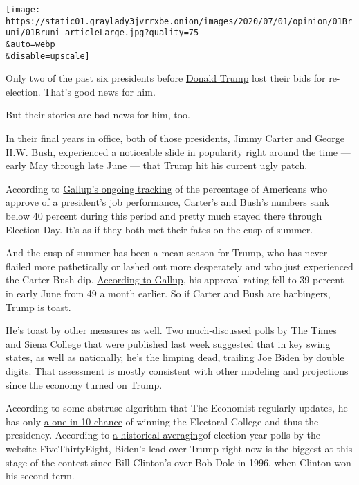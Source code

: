 \texttt{[image: https://static01.graylady3jvrrxbe.onion/images/2020/07/01/opinion/01Bruni/01Bruni-articleLarge.jpg?quality=75\\\&auto=webp\\\&disable=upscale]}

Only two of the past six presidents before
\href{https://www.nytimes3xbfgragh.onion/2020/07/01/us/politics/trump-fundraising-2020.html}{Donald
Trump} lost their bids for re-election. That's good news for him.

But their stories are bad news for him, too.

In their final years in office, both of those presidents, Jimmy Carter
and George H.W. Bush, experienced a noticeable slide in popularity right
around the time --- early May through late June --- that Trump hit his
current ugly patch.

According to
\href{https://news.gallup.com/interactives/185273/presidential-job-approval-center.aspx}{Gallup's
ongoing tracking} of the percentage of Americans who approve of a
president's job performance, Carter's and Bush's numbers sank below 40
percent during this period and pretty much stayed there through Election
Day. It's as if they both met their fates on the cusp of summer.

And the cusp of summer has been a mean season for Trump, who has never
flailed more pathetically or lashed out more desperately and who just
experienced the Carter-Bush dip.
\href{https://news.gallup.com/poll/203198/presidential-approval-ratings-donald-trump.aspx}{According
to Gallup}, his approval rating fell to 39 percent in early June from 49
a month earlier. So if Carter and Bush are harbingers, Trump is toast.

He's toast by other measures as well. Two much-discussed polls by The
Times and Siena College that were published last week suggested that
\href{https://www.nytimes3xbfgragh.onion/2020/06/25/upshot/poll-2020-biden-battlegrounds.html}{in
key swing states},
\href{https://www.nytimes3xbfgragh.onion/2020/06/24/us/politics/trump-biden-poll-nyt-upshot-siena-college.html}{as
well as nationally}, he's the limping dead, trailing Joe Biden by double
digits. That assessment is mostly consistent with other modeling and
projections since the economy turned on Trump.

According to some abstruse algorithm that The Economist regularly
updates, he has only
\href{https://projects.economist.com/us-2020-forecast/president}{a one
in 10 chance} of winning the Electoral College and thus the presidency.
According to
\href{https://fivethirtyeight.com/features/biden-has-a-historically-large-lead-over-trump-but-it-could-disappear/?cid=taboola_rcc_r}{a
historical averaging}of election-year polls by the website
FiveThirtyEight, Biden's lead over Trump right now is the biggest at
this stage of the contest since Bill Clinton's over Bob Dole in 1996,
when Clinton won his second term.

